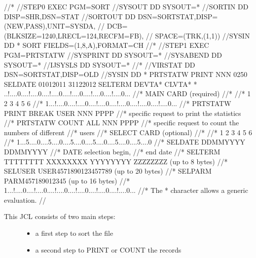 \documentclass[letterpaper,10pt,english]{sphinxmanual}
\begin{document}
\begin{sphinxVerbatim}[commandchars=\\\{\}]
//*
//STEP0 EXEC PGM=SORT
//SYSOUT DD SYSOUT=*
//SORTIN DD DISP=SHR,DSN=\PYGZam{}STAT
//SORTOUT DD DSN=\PYGZam{}\PYGZam{}SORTSTAT,DISP=(NEW,PASS),UNIT=SYSDA,
// DCB=(BLKSIZE=1240,LRECL=124,RECFM=FB),
// SPACE=(TRK,(1,1))
//SYSIN DD *
SORT FIELDS=(1,8,A),FORMAT=CH
//*
//STEP1 EXEC PGM=PRTSTATW
//SYSPRINT DD SYSOUT=*
//SYSABEND DD SYSOUT=*
//IJSYSLS DD SYSOUT=*
//*
//VIRSTAT DD DSN=\PYGZam{}\PYGZam{}SORTSTAT,DISP=OLD
//SYSIN DD *
PRTSTATW PRINT NNN 0250
SELDATE 01012011 31122012
SELTERM DEVTA* CLVTA*
* ..!....0....!....0....!....0....!....0....!....0....!....0...
//* MAIN CARD (required)
//* \PYGZhy{}\PYGZhy{}\PYGZhy{}\PYGZhy{}\PYGZhy{}\PYGZhy{}\PYGZhy{}\PYGZhy{}\PYGZhy{}
//* 1 2 3 4 5 6
//* 1...!....0....!....0....!....0....!....0....!....0....!....0...
//* PRTSTATW PRINT BREAK USER NNN PPPP
//* specific request to print the statistics
//* PRTSTATW COUNT \PYGZdl{}ALL\PYGZdl{} NNN PPPP
//* specific request to count the numbers of different
//* users
//* SELECT CARD (optional)
//* \PYGZhy{}\PYGZhy{}\PYGZhy{}\PYGZhy{}\PYGZhy{}\PYGZhy{}\PYGZhy{}\PYGZhy{}\PYGZhy{}\PYGZhy{}\PYGZhy{}
//* 1 2 3 4 5 6
//* 1...5....0....5....0....5....0....5....0....5....0....5....0
//* SELDATE DDMMYYYY DDMMYYYY
//* DATE selection begin,
//* end date
//* SELTERM TTTTTTTT XXXXXXXX YYYYYYYY ZZZZZZZZ (up to 8 bytes)
//* SELUSER USER4571890123457789 (up to 20 bytes)
//* SELPARM PARM457189012345 (up to 16 bytes)
//* 1...!....0....!....0....!....0....!....0....!....0....!....0...
//* The \PYGZsq{}*\PYGZsq{} character allows a generic evaluation.
//
\end{sphinxVerbatim}

\begin{description}
\item[{This JCL consists of two main steps:}] \leavevmode\begin{itemize}
\item {} 
a first step to sort the file

\item {} 
a second step to PRINT or COUNT the records

\end{itemize}

\end{description}

\newpage

\ignorespaces 
\end{document}
